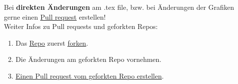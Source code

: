 \documentclass[a4paper, 11pt, ngerman, parskip=half-]{scrartcl}
\begin{document}
\vspace{5mm}
Bei \textbf{direkten Änderungen} am .tex file, bzw. bei Änderungen der Grafiken gerne einen \href{https://github.com/etschgi1/Ex2_Fragen/pulls}{\underline{Pull request}} erstellen!\\
Weiter Infos zu Pull requests und geforkten Repos:\\
\begin{enumerate}
    \item Das \href{https://github.com/etschgi1/Ex2_Fragen}{\underline{Repo}} zuerst \href{https://docs.github.com/en/get-started/quickstart/fork-a-repo}{\underline{forken}}.
    \item Die Änderungen am geforkten Repo vornehmen.
    \item \href{https://docs.github.com/en/github/collaborating-with-pull-requests/proposing-changes-to-your-work-with-pull-requests/creating-a-pull-request-from-a-fork}{\underline{Einen Pull request vom geforkten Repo erstellen}}.
\end{enumerate}
\end{document}
